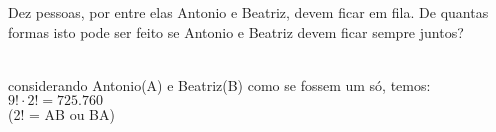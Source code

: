 \begin{ex}
 Dez pessoas, por entre elas Antonio e Beatriz, devem ficar em fila. De quantas formas isto pode ser feito se Antonio e Beatriz devem ficar sempre juntos?
 \begin{sol}
     \phantom{A} \\
  considerando Antonio(A) e Beatriz(B) como se fossem um só, temos: $9!\cdot2!= 725.760$\\
  \phantom{AA}(2! = AB ou BA)
 \end{sol}
\end{ex}